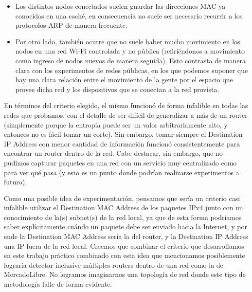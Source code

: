 \documentclass{article}
\theoremstyle{definition}
\theoremstyle{remark}
\begin{document}
\begin{itemize}
\item Los distintos nodos conectados suelen guardar las direcciones MAC ya conocidas en una caché, en consecuencia no suele ser necesario recurrir a los protocolos ARP de manera frecuente.

\item Por otro lado, también ocurre que no suele haber mucho movimiento en los nodos en una red Wi-Fi controlada y no pública (refiriéndonos a movimiento como ingreso de nodos nuevos de manera seguida). Esto contrasta de manera clara con los experimentos de redes públicas, en los que podemos suponer que hay una clara relación entre el movimiento de la gente por el espacio que provee dicha red y los dispositivos que se conectan a la red provista.
\end{itemize}

En términos del criterio elegido, el mismo funcionó de forma infalible en todas las redes que probamos, con el detalle de ser difícil de generalizar a más de un router (simplemente porque la entropía puede ser un valor arbitrariamente alto, y entonces no es fácil tomar un corte). Sin embargo, tomar siempre el Destination IP Address con menor cantidad de información funcionó consistentemente para encontrar un router dentro de la red. Cabe destacar, sin embargo, que no pudimos capturar paquetes en una red con un servicio muy centralizado como para ver qué pasa (y esto es un punto donde podrían realizarse experimentos a futuro).

Como una posible idea de experimentación, pensamos que sería un criterio casi infalible utilizar el Destination MAC Address de los paquetes IPv4 junto con un conocimiento de la(s) subnet(s) de la red local, ya que de esta forma podríamos saber explícitamente cuándo un paquete debe ser enviado hacia la Internet, y por ende la Destination MAC Address sería la del router, y la Destination IP Address una IP fuera de la red local. Creemos que combinar el criterio que desarrollamos en este trabajo práctico combinado con esta idea que mencionamos posiblemente lograría detectar inclusive múltiples routers dentro de una red como la de MercadoLibre. No logramos imaginarnos una topología de red donde este tipo de metodología falle de forma evidente.
\end{document}
